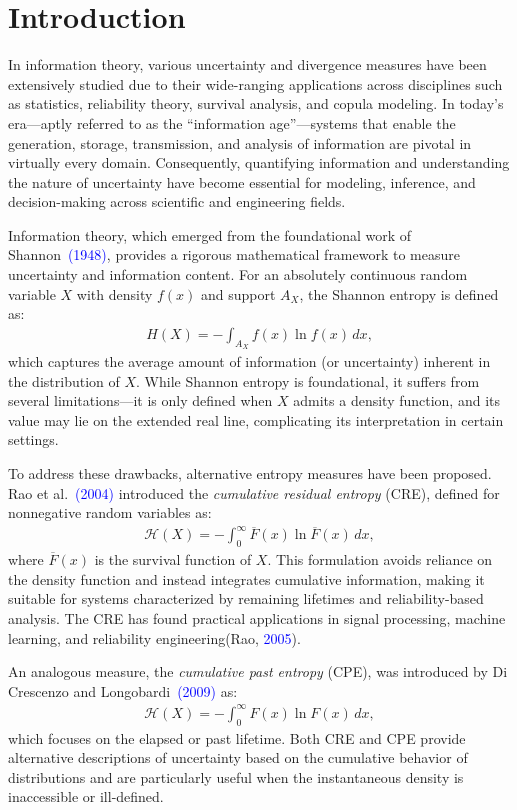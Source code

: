 \documentclass[12pt, a4paper]{article}
\numberwithin{equation}{section}
\begin{document}
\section{Introduction}
In information theory, various uncertainty and divergence measures have been extensively studied due to their wide-ranging applications across disciplines such as statistics, reliability theory, survival analysis, and copula modeling. In today’s era—aptly referred to as the “information age”—systems that enable the generation, storage, transmission, and analysis of information are pivotal in virtually every domain. Consequently, quantifying information and understanding the nature of uncertainty have become essential for modeling, inference, and decision-making across scientific and engineering fields.

Information theory, which emerged from the foundational work of Shannon~\textcolor{blue}{(1948)}, provides a rigorous mathematical framework to measure uncertainty and information content. For an absolutely continuous random variable $X$ with density $f(x)$ and support $A_X$, the Shannon entropy is defined as:
\begin{align}
	H(X) = -\int_{A_X} f(x) \ln f(x) \, dx,
\end{align}
which captures the average amount of information (or uncertainty) inherent in the distribution of $X$. While Shannon entropy is foundational, it suffers from several limitations—it is only defined when $X$ admits a density function, and its value may lie on the extended real line, complicating its interpretation in certain settings.

To address these drawbacks, alternative entropy measures have been proposed. Rao et al.~\textcolor{blue}{(2004)} introduced the \textit{cumulative residual entropy} (CRE), defined for nonnegative random variables as:
\begin{align}
	\mathcal{H}(X) = -\int_0^\infty \overline{F}(x) \ln \overline{F}(x) \, dx,
\end{align}
where $\overline{F}(x)$ is the survival function of $X$. This formulation avoids reliance on the density function and instead integrates cumulative information, making it suitable for systems characterized by remaining lifetimes and reliability-based analysis. The CRE has found practical applications in signal processing, machine learning, and reliability engineering(Rao, \textcolor{blue}{2005}).

An analogous measure, the \textit{cumulative past entropy} (CPE), was introduced by Di Crescenzo and Longobardi~\textcolor{blue}{(2009)} as:
\begin{align}
	\mathcal{H}(X) = -\int_0^\infty F(x) \ln F(x) \, dx,
\end{align}
which focuses on the elapsed or past lifetime. Both CRE and CPE provide alternative descriptions of uncertainty based on the cumulative behavior of distributions and are particularly useful when the instantaneous density is inaccessible or ill-defined.
\end{document}
